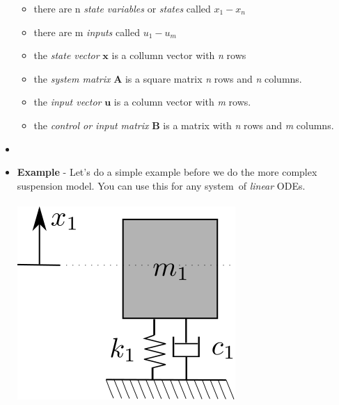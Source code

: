\documentclass[11pt]{article}
\begin{document}
\begin{itemize}
	\begin{itemize}

		\item there are n {\it state variables} or {\it states} called $x_1 - x_n$ 
		\item there are m {\it inputs} called $u_1 - u_m$ 
		\item the {\it state vector} $\bm{x}$ is a collumn vector with {\it n} rows
		\item the {\it system matrix} $\bm{A}$ is a square matrix {\it n} rows and {\it n} columns.
		\item the {\it input vector} $\bm{u}$ is a column vector with {\it m} rows.
		\item the {\it control or input matrix} $\bm{B}$ is a matrix with {\it n} rows and {\it m} columns. \\

	\end{itemize}
\item 

\item \textbf{ \Large Example} - Let's do a simple example before we do the more complex suspension model. You can use this for any system\ of {\it linear} ODEs. \\\\

\includegraphics[scale=.5]{mass_spring_1dof.png} \\
\end{itemize}
\end{document}
